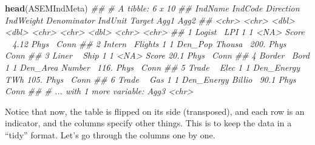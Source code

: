 \documentclass[
]{book}
\newenvironment{Shaded}{\begin{snugshade}}{\end{snugshade}}
\newcommand{\CommentTok}[1]{\textcolor[rgb]{0.56,0.35,0.01}{\textit{#1}}}
\newcommand{\KeywordTok}[1]{\textcolor[rgb]{0.13,0.29,0.53}{\textbf{#1}}}
\newcommand{\NormalTok}[1]{#1}
\begin{document}
\begin{Shaded}
\begin{Highlighting}[]
\KeywordTok{head}\NormalTok{(ASEMIndMeta)}
\CommentTok{## # A tibble: 6 x 10}
\CommentTok{##   IndName IndCode Direction IndWeight Denominator IndUnit Target Agg1  Agg2 }
\CommentTok{##   <chr>   <chr>       <dbl>     <dbl> <chr>       <chr>    <dbl> <chr> <chr>}
\CommentTok{## 1 Logist~ LPI             1         1 <NA>        Score ~   4.12 Phys~ Conn }
\CommentTok{## 2 Intern~ Flights         1         1 Den_Pop     Thousa~ 200.   Phys~ Conn }
\CommentTok{## 3 Liner ~ Ship            1         1 <NA>        Score    20.1  Phys~ Conn }
\CommentTok{## 4 Border~ Bord            1         1 Den_Area    Number~ 116.   Phys~ Conn }
\CommentTok{## 5 Trade ~ Elec            1         1 Den_Energy  TWh     105.   Phys~ Conn }
\CommentTok{## 6 Trade ~ Gas             1         1 Den_Energy  Billio~  90.1  Phys~ Conn }
\CommentTok{## # ... with 1 more variable: Agg3 <chr>}
\end{Highlighting}
\end{Shaded}

Notice that now, the table is flipped on its side (transposed), and each row is an indicator, and the columns specify other things. This is to keep the data in a ``tidy'' format. Let's go through the columns one by one.
\end{document}
